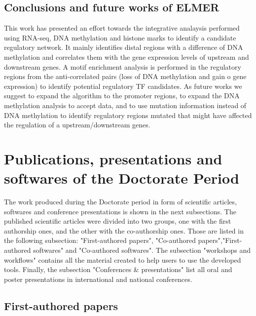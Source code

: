 \subsection{Conclusions and future works of ELMER}

This work has presented an effort towards the integrative analaysis performed
using RNA-seq, DNA methylation and histone marks to identify a candidate regulatory network.
It mainly identifies distal regions with a difference of DNA methylation and correlates them
with the gene expression levels of upstream and downstream genes.
A motif enrichment analysis is performed in the regulatory regions from the anti-correlated
pairs (loss of DNA methylation and gain o gene expression) to identify potential
regulatory TF candidates. As future works we suggest to expand the algorithm to
the promoter regions, to expand the DNA methylation analysis to accept
 data, 
 and to use mutation information instead of DNA methylation
to identify regulatory regions mutated that might have affected the
regulation of a upstream/downstream genes.


\section{Publications, presentations and softwares of the Doctorate Period}

The work produced during the Doctorate period in form of scientific articles,
softwares and conference presentations is shown in the next subsections.
The published scientific articles were divided into two groups, one with the  first authorship ones, and the other with the co-authorship ones. Those are listed in the following subsection: "First-authored papers", "Co-authored papers","First-authored softwares" and "Co-authored softwares".
The subsection "workshops and workflows" contains all the material created to help users to use the developed tools. Finally, the subsection "Conferences \& presentations" list all oral and poster presentations in international and national conferences.

\subsection{First-authored papers}

